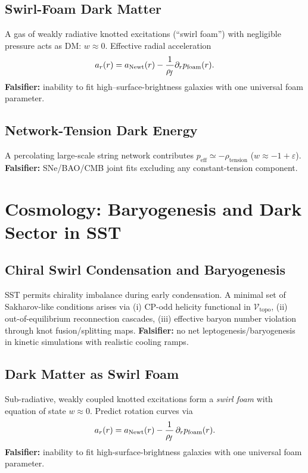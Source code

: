 \documentclass[10pt,reprint,aps,onecolumn,nofootinbib]{revtex4-2}
\begin{document}
\subsection{Swirl-Foam Dark Matter}
    A gas of weakly radiative knotted excitations (“swirl foam”) with negligible pressure acts as DM: \(w\approx 0\).
    Effective radial acceleration
    \[
        a_r(r)=a_{\text{Newt}}(r)-\frac{1}{\rho_{\!f}}\partial_r p_{\text{foam}}(r).
    \]
    \textbf{Falsifier:} inability to fit high–surface-brightness galaxies with one universal foam parameter.

\subsection{Network-Tension Dark Energy}
    A percolating large-scale string network contributes \(p_{\text{eff}}\simeq -\rho_{\text{tension}}\) (\(w\approx -1+\varepsilon\)).
    \textbf{Falsifier:} SNe/BAO/CMB joint fits excluding any constant-tension component.


\section{Cosmology: Baryogenesis and Dark Sector in SST}
\label{sec:SST-cosmology}

    \subsection{Chiral Swirl Condensation and Baryogenesis}
        SST permits chirality imbalance during early condensation. A minimal set of Sakharov-like conditions arises via (i) CP-odd helicity functional in $\mathcal{V}_{\text{topo}}$, (ii) out-of-equilibrium reconnection cascades, (iii) effective baryon number violation through knot fusion/splitting maps. \textbf{Falsifier:} no net leptogenesis/baryogenesis in kinetic simulations with realistic cooling ramps.

    \subsection{Dark Matter as Swirl Foam}
        Sub-radiative, weakly coupled knotted excitations form a \emph{swirl foam} with equation of state $w\approx 0$. Predict rotation curves via
        \[
            a_r(r)=a_{\text{Newt}}(r)-\frac{1}{\rho_{\!f}}\,\partial_r p_{\text{foam}}(r).
        \]
        \textbf{Falsifier:} inability to fit high-surface-brightness galaxies with one universal foam parameter.
\end{document}
